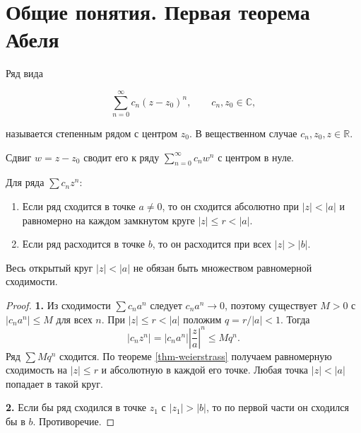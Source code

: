 \section{Общие понятия. Первая теорема Абеля}\label{sec-power-series-01}

\begin{definition}\label{def-power-series}

Ряд вида

\begin{equation}
\sum_{n=0}^\infty c_n(z-z_0)^n,
\qquad c_n,z_0\in\mathbb C,
\label{eq-power-series}
\end{equation}

называется степенным рядом с центром \(z_0\). В вещественном случае \(c_n,z_0,z\in\mathbb R\).

Сдвиг \(w=z-z_0\) сводит его к ряду \(\sum_{n=0}^\infty c_nw^n\) с центром в нуле.

\end{definition}

\begin{theorem}\label{thm-abel-first}

Для ряда \(\sum c_nz^n\):

\begin{enumerate}
\def\labelenumi{\arabic{enumi}.}
\tightlist
\item
  Если ряд сходится в точке \(a\ne0\), то он сходится абсолютно при \(|z|<|a|\) и равномерно на каждом замкнутом круге \(|z|\le r<|a|\).
\item
  Если ряд расходится в точке \(b\), то он расходится при всех \(|z|>|b|\).
\end{enumerate}

\end{theorem}

Весь открытый круг \(|z|<|a|\) не обязан быть множеством равномерной сходимости.

\begin{proof}

\textbf{1.} Из сходимости \(\sum c_na^n\) следует \(c_na^n\to0\), поэтому существует \(M>0\) с \(|c_na^n|\le M\) для всех \(n\). При \(|z|\le r<|a|\) положим \(q=r/|a|<1\). Тогда \[
|c_nz^n|=|c_na^n|\left|\frac za\right|^n\le Mq^n.
\] Ряд \(\sum Mq^n\) сходится. По теореме \ref{thm-weierstrass} получаем равномерную сходимость на \(|z|\le r\) и абсолютную в каждой его точке. Любая точка \(|z|<|a|\) попадает в такой круг.

\textbf{2.} Если бы ряд сходился в точке \(z_1\) с \(|z_1|>|b|\), то по первой части он сходился бы в \(b\). Противоречие.

\end{proof}

